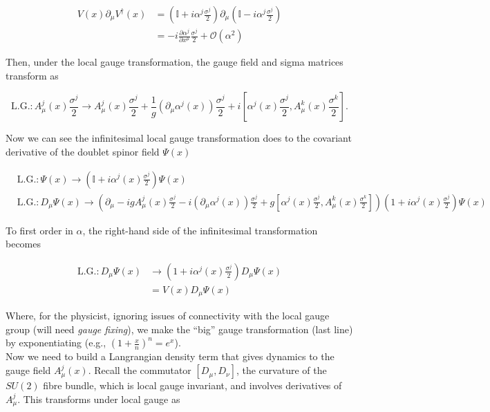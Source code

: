 \documentclass[10pt]{article}
\begin{document}
\begin{align}
V(x) \partial_\mu V^\dagger (x) &= (\mathbb{I} + i \alpha^j \frac{\sigma^j}{2}) \partial_\mu (\mathbb{I} - i \alpha^j \frac{\sigma^j}{2}) \\
&= -i \frac{\partial \alpha^j}{\partial x^\mu} \frac{\sigma^j}{2} + \mathcal{O}(\alpha^2)
\end{align}

\noindent Then, under the local gauge transformation, the gauge field and sigma matrices transform as

\begin{equation}
\text{L.G.}: A_\mu^j (x) \frac{\sigma^j}{2} \rightarrow A_\mu^j (x) \frac{\sigma^j}{2} + \frac{1}{g} (\partial_\mu \alpha^j (x)) \frac{\sigma^j}{2} + i \left[ \alpha^j (x) \frac{\sigma^j}{2}, A_\mu^k (x) \frac{\sigma^k}{2} \right].
\end{equation}

\noindent Now we can see the infinitesimal local gauge transformation does to the covariant derivative of the doublet spinor field $\Psi (x)$

\begin{align}
&\text{L.G.}: \Psi (x) \rightarrow \left( \mathbb{I} + i \alpha^j (x) \frac{\sigma^j}{2} \right) \Psi (x) \\
&\text{L.G.}: D_\mu \Psi (x) \rightarrow \left( \partial_\mu - i g A_\mu^j (x) \frac{\sigma^j}{2} - i (\partial_\mu \alpha^j (x)) \frac{\sigma^j}{2} + g \left[ \alpha^j (x) \frac{\sigma^j}{2}, A_\mu^k (x) \frac{\sigma^k}{2} \right] \right) \left(1 + i \alpha^j (x) \frac{\sigma^j}{2} \right) \Psi (x)
\end{align}

\noindent To first order in $\alpha$, the right-hand side of the infinitesimal transformation becomes

\begin{align}
\text{L.G.}: D_\mu \Psi (x) &\rightarrow \left( 1 + i \alpha^j (x) \frac{\sigma^j}{2} \right) D_\mu \Psi (x) \\
&= V(x) D_\mu \Psi (x)
\end{align}

\noindent Where, for the physicist, ignoring issues of connectivity with the local gauge group (will need \textit{gauge fixing}), we make the ``big'' gauge transformation (last line) by exponentiating (e.g., $(1+\frac{x}{n})^n = e^x$). \\

\noindent Now we need to build a Langrangian density term that gives dynamics to the gauge field $A^j_\mu (x)$. Recall the commutator $[D_\mu, D_\nu]$, the curvature of the $SU(2)$ fibre bundle, which is local gauge invariant, and involves derivatives of $A_\mu^j$. This transforms under local gauge as
\end{document}
